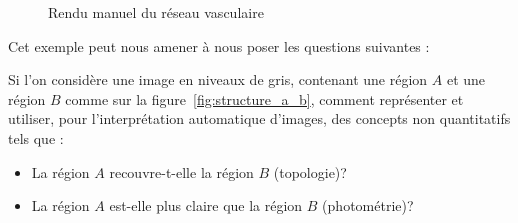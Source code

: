 	\begin{figure}[!ht]	%
	  \centering
							\hspace{0.4em}
			\hspace{0.4em}
		\caption{Rendu manuel du réseau vasculaire}
	\end{figure}
	
	Cet exemple peut nous amener à nous poser les questions suivantes :\vspace{1 em}

	Si l'on considère une image en niveaux de gris, contenant une région $A$ et une région $B$ comme sur la figure~\ref{fig:structure_a_b}, comment représenter et utiliser, pour l'interprétation automatique d'images, des concepts non quantitatifs tels que :


	\begin{itemize}
		\item La région $A$ recouvre-t-elle la région $B$ (topologie)?
		\item La région $A$ est-elle plus claire que la région $B$ (photométrie)?
	\end{itemize}
\vspace{1em}

